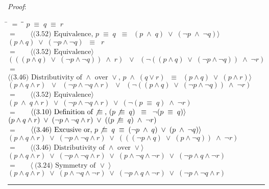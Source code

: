 \documentclass[12pt, fleqn, leqno]{article}
\newcommand{\lgap}{2pt}                             %
\newcommand{\mymathindent}{24pt}                    %
\newcommand{\equivs}{\ensuremath{\;\equiv\;}}       %
\newcommand{\equivss}{\ensuremath{\;\;\equiv\;\;}}  %
\newcommand{\lors}{\ensuremath{\;\lor\;}}           %
\newcommand{\lorss}{\ensuremath{\;\;\lor\;\;}}      %
\newcommand{\lands}{\ensuremath{\;\land\;}}      %
\newcommand{\nequiv}{\ensuremath{\not\equivs}}       %
\newcommand{\myqed}{\rule[-.23ex]{1.2ex}{2.0ex}}
\newcommand{\myqedtab}{\hspace{384pt}}              %
\newcommand{\Gll} {\langle}                         %
\newcommand{\Ggg} {\rangle}                         %
\newcommand{\Hint}[1]     {\ \ \ $\Gll              \mbox{#1} \Ggg$ }   %
\begin{document}
\textit{Proof}:
\begin{tabbing}
\hspace{\mymathindent} \= $= \;$ \= \myqedtab \= \kill
	\> \>  $p \equivs q \equivs r$\\
	\> $=$  \>  \Hint{(3.52) Equivalence, $p \equivs q \equivss (p \lands q) \lors (\lnot p \lands \lnot q)$}\\[\lgap]
	\> \>   $(p \land q) \lors (\lnot p \land \lnot q)\equivss r$\\
	\> $=$  \>  \Hint{(3.52) Equivalence}\\[\lgap]
	\> \>   $(((p \land q) \lors (\lnot p \land \lnot q)) \lands r) \lorss (\lnot ((p \land q) \lors (\lnot p \land \lnot q)) \lands \lnot r)$\\
	\> $=$  \>  \Hint{(3.46) Distributivity of $\land$ over $\lor$, $p \lands (q \lor r) \equivss (p \land q) \lors (p \land r)$}\\[\lgap]
	\> \>   $(p \land q \land r) \lorss (\lnot p \land \lnot q \land r) \lorss (\lnot ((p \land q) \lors (\lnot p \land \lnot q)) \lands \lnot r)$\\
	\> $=$  \>  \Hint{(3.52) Equivalence}\\[\lgap]
	\> \>  $(p \lands q \land r) \lors (\lnot p \land \lnot q \land r) \lors (\lnot (p \equivs q) \lands \lnot r)$\\
	\> $=$  \>  \Hint{(3.10) Definition of $\nequiv$, $(p \nequiv q) \equivss \lnot (p \equivs q)$}\\[\lgap]
	\> \>   $(p \land q \land r) \lors (\lnot p \land \lnot q \land r) \lors ((p \nequiv q) \lands \lnot r)$\\
	\> $=$  \>  \Hint{(3.46) Excusive or, $p \nequiv q \equivs (\lnot p \lands q) \lors (p \lands \lnot q)$}\\[\lgap]
	\> \>   $(p \land q \land r) \lors (\lnot p \land \lnot q \land r) \lors (((\lnot p \land q) \lors (p \land \lnot q)) \lands \lnot r)$\\
	\> $=$  \>  \Hint{(3.46) Distributivity of $\land$ over $\lor$}\\[\lgap]
	\> \>   $(p \land q \land r) \lors (\lnot p \land \lnot q \land r) \lors (p \land \lnot q \land \lnot r) \lors (\lnot p \land q \land \lnot r)$\\
	\> $=$  \>  \Hint{(3.24) Symmetry of $\lors$}\\[\lgap]
	\> \>   $(p \land q \land r) \lors (p \land \lnot q \land \lnot r) \lors (\lnot p \land q \land \lnot r) \lors (\lnot p \land \lnot q \land r) $ \quad \myqed\\
\end{tabbing}
\end{document}
